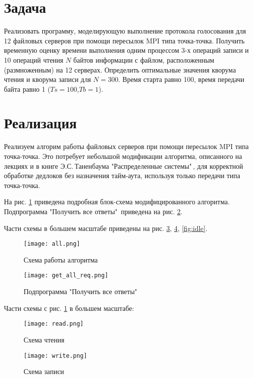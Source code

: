 \section*{Задача}
Реализовать программу, моделирующую выполнение протокола голосования для
12 файловых серверов при помощи пересылок MPI типа точка-точка. Получить
временную оценку времени выполнения одним процессом 3-х операций записи и
10 операций чтения $N$ байтов информации с файлом, расположенным (размноженным)
на 12 серверах. Определить оптимальные значения кворума чтения и кворума записи
для $N=300$. Время старта равно 100, время передачи байта равно 1
($Ts=100$,$Tb=1$).


\section*{Реализация}

Реализуем алгорим работы файловых серверов при помощи пересылок MPI типа
точка-точка. Это потребует небольшой модификации алгоритма, описанного на
лекциях и в книге Э.С.\,Таненбаума "Распределенные системы"\,, для корректной
обработке дедлоков без назначения тайм-аута, используя только передачи типа
точка-точка.

На рис. \ref{fig:all} приведена подробная блок-схема модифицированного
алгоритма. Подпрограмма "Получить все ответы"\, приведена на рис.
\ref{fig:get_all_req}.

Части схемы в большем масштабе приведены на рис. \ref{fig:read},
\ref{fig:write}, \ref{fig:idle}.

\begin{figure}[H]
    \centering
    \texttt{[image: all.png]}
    \caption{Схема работы алгоритма}
    \label{fig:all}
\end{figure}

\begin{figure}[H]
    \centering
    \texttt{[image: get\_all\_req.png]}
    \caption{Подпрограмма "Получить все ответы"\,}
    \label{fig:get_all_req}
\end{figure}

Части схемы с рис. \ref{fig:all} в большем масштабе:

\begin{figure}[H]
    \centering
    \texttt{[image: read.png]}
    \caption{Схема чтения}
    \label{fig:read}
\end{figure}

\begin{figure}[H]
    \centering
    \texttt{[image: write.png]}
    \caption{Схема записи}
    \label{fig:write}
\end{figure}

